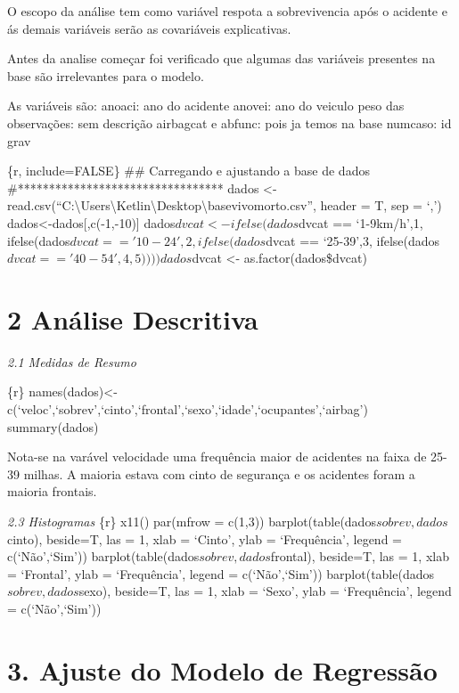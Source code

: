 \documentclass[
]{article}
\begin{document}
O escopo da análise tem como variável respota a sobrevivencia após o
acidente e ás demais variáveis serão as covariáveis explicativas.

Antes da analise começar foi verificado que algumas das variáveis
presentes na base são irrelevantes para o modelo.

As variáveis são: anoaci: ano do acidente anovei: ano do veiculo peso
das observações: sem descrição airbagcat e abfunc: pois ja temos na base
numcaso: id grav

\{r, include=FALSE\} \#\# Carregando e ajustando a base de dados
\#********************************* dados \textless-
read.csv(``C:\textbackslash Users\textbackslash Ketlin\textbackslash Desktop\textbackslash basevivomorto.csv'',
header = T, sep = `,') dados\textless-dados{[},c(-1,-10){]}
dados\(dvcat <- ifelse(dados\)dvcat == `1-9km/h',1,
ifelse(dados\(dvcat == '10-24',2,  ifelse(dados\)dvcat == `25-39',3,
ifelse(dados\(dvcat == '40-54',4,5)))) dados\)dvcat \textless-
as.factor(dados\$dvcat)

\hypertarget{anuxe1lise-descritiva}{%
\section{2 Análise Descritiva}\label{anuxe1lise-descritiva}}

\emph{2.1 Medidas de Resumo}

\{r\}
names(dados)\textless-c(`veloc',`sobrev',`cinto',`frontal',`sexo',`idade',`ocupantes',`airbag')
summary(dados)

Nota-se na varável velocidade uma frequência maior de acidentes na faixa
de 25-39 milhas. A maioria estava com cinto de segurança e os acidentes
foram a maioria frontais.

\emph{2.3 Histogramas} \{r\} x11() par(mfrow = c(1,3))
barplot(table(dados\(sobrev,dados\)cinto), beside=T, las = 1, xlab =
`Cinto', ylab = `Frequência', legend = c(`Não',`Sim'))
barplot(table(dados\(sobrev,dados\)frontal), beside=T, las = 1, xlab =
`Frontal', ylab = `Frequência', legend = c(`Não',`Sim'))
barplot(table(dados\(sobrev,dados\)sexo), beside=T, las = 1, xlab =
`Sexo', ylab = `Frequência', legend = c(`Não',`Sim'))

\hypertarget{ajuste-do-modelo-de-regressuxe3o}{%
\section{3. Ajuste do Modelo de
Regressão}\label{ajuste-do-modelo-de-regressuxe3o}}
\end{document}
